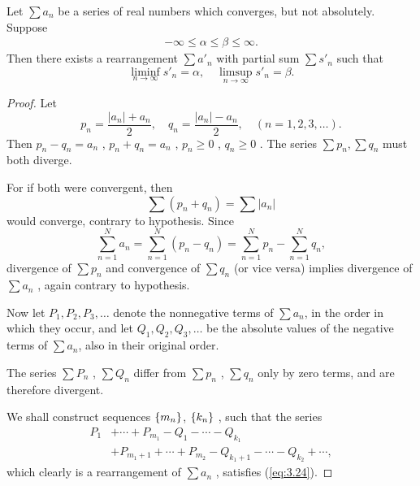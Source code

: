 \begin{thm}
    \label{thm:3.54}
    Let $\sum a_n$ be a series of real numbers which converges, but not absolutely.
    Suppose
    \begin{align*}
        -\infty 
        \leq \alpha 
        \leq \beta 
        \leq \infty.
    \end{align*}
    Then there exists a rearrangement $\sum a'_n$ with partial sum $\sum s'_n$ such that 
    \begin{equation}
        \label{eq:3.24}
        \liminf_{n \to \infty} s'_n = \alpha,\quad
        \limsup_{n \to \infty} s'_n = \beta.
    \end{equation}
\end{thm}

\begin{proof}
    Let
    \begin{equation*}
        p_n = \frac{\left| a_n \right| + a_n}{2}, \quad
        q_n = \frac{\left| a_n \right| - a_n}{2}, \quad
        (n = 1,2,3,\dots).
    \end{equation*}
    Then $p_n - q_n = a_n$ , $p_n + q_n = a_n$ , $p_n \geq 0$ , $q_n \geq 0$ .
    The series $\sum p_n, \sum q_n$ must both diverge.

    For if both were convergent, then 
    \begin{equation*}
        \sum (p_n + q_n) = \sum \left| a_n \right| 
    \end{equation*}
    would converge, contrary to hypothesis. Since
    \begin{equation*}
        \sum_{n=1}^{N} a_n = 
        \sum_{n=1}^{N} (p_n - q_n) = 
        \sum_{n=1}^{N} p_n -
        \sum_{n=1}^{N} q_n ,
    \end{equation*}
    divergence of $\sum p_n$ and convergence of $\sum q_n$ (or vice versa) implies divergence of $\sum a_n$ , again contrary to hypothesis.

    Now let $P_1, P_2, P_3, \dots$ denote the nonnegative terms of $\sum a_n$, in the order in which they occur,
    and let $Q_1, Q_2, Q_3, \dots$ be the absolute values of the negative terms of $\sum a_n$, also in their original order.

    The series $\sum P_n$ , $\sum Q_n$ differ from $\sum p_n$ , $\sum q_n$ only by zero terms, and are therefore divergent.

    We shall construct sequences $\protect\{m_n\}$, $\protect\{k_n\}$ , such that the series 
    \begin{equation}
        \label{eq:3.25}
        \begin{aligned}
            P_1 
            &+ \cdots + P_{m_1} - Q_1 - \cdots - Q_{k_1} \\
            &+ P_{m_1 + 1} + \cdots + P_{m_2} - Q_{k_1 + 1} - \cdots - Q_{k_2} + \cdots,
        \end{aligned}
    \end{equation} 
    which clearly is a rearrangement of $\sum a_n$ , satisfies (\ref{eq:3.24}).


\end{proof}
